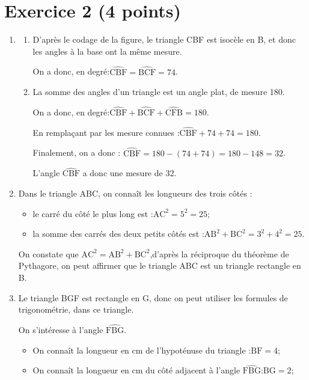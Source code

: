 \documentclass[12pt,a4paper,french]{article}
\begin{document}
\section*{Exercice 2 (4 points)}
\begin{enumerate}
	\item \begin{enumerate}
		\item D'après le codage de la figure, le triangle CBF est isocèle en B, et donc les angles à la base ont la même mesure.

		On a donc, en degré:\quad $\widehat{\mathrm{CBF}} = \widehat{\mathrm{BCF}} = 74$.

		\item La somme des angles d'un triangle est un angle plat, de mesure 180\degres.

		On a donc, en degré:\quad $\widehat{\mathrm{CBF}}+\widehat{\mathrm{BCF}}+\widehat{\mathrm{CFB}} = 180$.

		En remplaçant par les mesure connues :\quad $\widehat{\mathrm{CBF}} + 74 + 74 = 180$.

		Finalement, on a donc : \quad $\widehat{\mathrm{CBF}} = 180 - (74 + 74) = 180 - 148 = 32$.

		L'angle $\widehat{\mathrm{CBF}}$ a donc une mesure de 32\degres.
	\end{enumerate}

	\item Dans le triangle ABC, on connaît les longueurs des trois côtés :
	\begin{itemize}
		\item le carré du côté le plus long est :\quad $\mathrm{AC}^2 = 5^2 = 25$;
		\item la somme des carrés des deux petits côtés est :\quad $\mathrm{AB}^2 + \mathrm{BC}^2 = 3^2 + 4^2 = 25$.
	\end{itemize}

	On constate que \quad $\mathrm{AC}^2 = \mathrm{AB}^2 + \mathrm{BC}^2$,\quad d'après la réciproque du théorème de Pythagore, on peut affirmer que le triangle ABC est un triangle rectangle en B.

	\item Le triangle BGF est rectangle en G, donc on peut utiliser les formules de trigonométrie, dans ce triangle.

	On s'intéresse à l'angle $\widehat{\mathrm{FBG}}$.

	\begin{itemize}
		\item On connaît la longueur en cm de l'hypoténuse du triangle :\quad $\mathrm{BF} = 4$;
		\item On connaît la longueur en cm du côté adjacent à l'angle $\widehat{\mathrm{FBG}}$:\quad $\mathrm{BG} = 2$;
	\end{itemize}


\end{enumerate}
\end{document}
